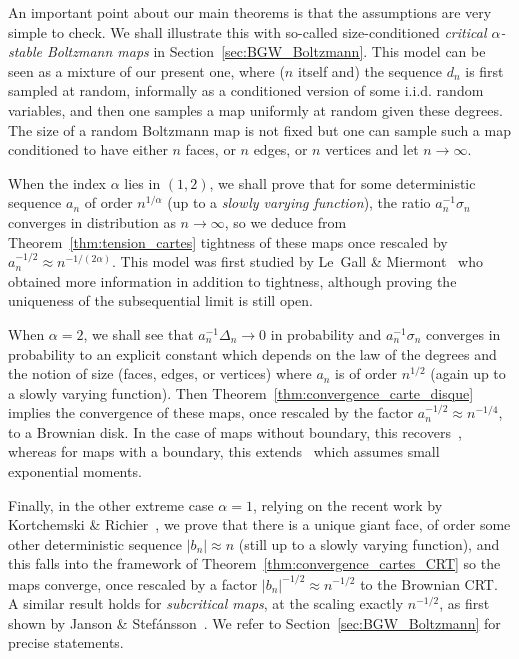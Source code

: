 \documentclass[AHL,Unicode,longabstracts,published]{cedram}
\newcommand{\1}{\ensembles{1}}
\begin{document}
An important point about our main theorems is that the assumptions are very simple to check. We shall illustrate this with so-called size-conditioned \emph{critical $\alpha$-stable Boltzmann maps} in Section~\ref{sec:BGW_Boltzmann}. This model can be seen as a mixture of our present one, where ($n$ itself and) the sequence $d_n$ is first sampled at random, informally as a conditioned version of some i.i.d. random variables, and then one samples a map uniformly at random given these degrees. The size of a random Boltzmann map is not fixed but one can sample such a map conditioned to have either $n$ faces, or $n$ edges, or $n$ vertices and let $n \to \infty$.

When the index $\alpha$ lies in $(1,2)$, we shall prove that for some deterministic sequence $a_n$ of order $n^{1/\alpha}$ (up to a \emph{slowly varying function}), the ratio $a_n^{-1} \sigma_n$ converges in distribution as $n\to\infty$, so we deduce from Theorem~\ref{thm:tension_cartes} tightness of these maps once rescaled by $a_n^{-1/2} \approx n^{-1/(2\alpha)}$. This model was first studied by Le~Gall \& Miermont~\cite{LGM11} who obtained more information in addition to tightness, although proving the uniqueness of the subsequential limit is still open.

When $\alpha=2$, we shall see that $a_n^{-1} \Delta_n \to 0$ in probability and $a_n^{-1} \sigma_n$ converges in probability to an explicit constant which depends on the law of the degrees and the notion of size (faces, edges, or vertices) where $a_n$ is of order $n^{1/2}$ (again up to a slowly varying function). Then Theorem~\ref{thm:convergence_carte_disque} implies the convergence of these maps, once rescaled by the factor $a_n^{-1/2} \approx n^{-1/4}$, to a Brownian disk. In the case of maps without boundary, this recovers~\cite[Theorem~1]{Mar18a}, whereas for maps with a boundary, this extends~\cite[Theorem~5]{BM17} which assumes small exponential moments.

Finally, in the other extreme case $\alpha=1$, relying on the recent work by Kortchemski \& Richier~\cite{KR19}, we prove that there is a unique giant face, of order some other deterministic sequence $|b_n| \approx n$ (still up to a slowly varying function), and this falls into the framework of Theorem~\ref{thm:convergence_cartes_CRT} so the maps converge, once rescaled by a factor $|b_n|^{-1/2} \approx n^{-1/2}$ to the Brownian CRT. A similar result holds for \emph{subcritical maps}, at the scaling exactly $n^{-1/2}$, as first shown by Janson \& Stefánsson~\cite{JS15}. We refer to Section~\ref{sec:BGW_Boltzmann} for precise statements.
\end{document}
